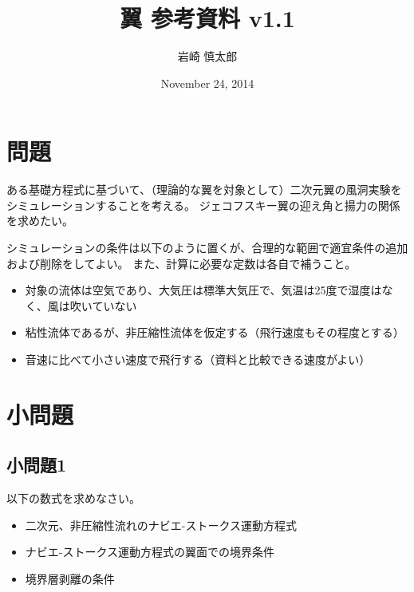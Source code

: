 \documentclass{article}
\title{ 翼 参考資料 v1.1 }
\author{ 岩崎 慎太郎 }
\begin{document}
\date{November 24, 2014}
\maketitle

\section{ 問題 }

ある基礎方程式に基づいて、（理論的な翼を対象として）二次元翼の風洞実験をシミュレーションすることを考える。
ジェコフスキー翼の迎え角と揚力の関係を求めたい。

シミュレーションの条件は以下のように置くが、合理的な範囲で適宜条件の追加および削除をしてよい。
また、計算に必要な定数は各自で補うこと。

\begin{itemize}
\item 対象の流体は空気であり、大気圧は標準大気圧で、気温は25度で湿度はなく、風は吹いていない
\item 粘性流体であるが、非圧縮性流体を仮定する（飛行速度もその程度とする）
\item 音速に比べて小さい速度で飛行する（資料と比較できる速度がよい）
\end{itemize}


\section{ 小問題 }

\subsection{ 小問題1 }

以下の数式を求めなさい。
\begin{itemize}
\item 二次元、非圧縮性流れのナビエ-ストークス運動方程式
\item ナビエ-ストークス運動方程式の翼面での境界条件
\item 境界層剥離の条件
\end{itemize}
\end{document}
